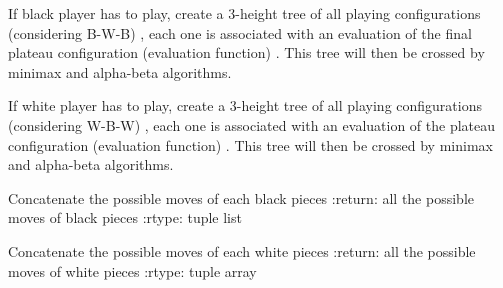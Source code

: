 \documentclass[letterpaper,10pt,french]{sphinxmanual}
\begin{document}
\begin{fulllineitems}
\label{\detokenize{autodoc:echecs.create_tree_B}}
If black player has to play, create a 3-height tree of all playing configurations (considering B-W-B)
, each one is associated with an evaluation of the final plateau configuration (evaluation function)
. This tree will then be crossed by minimax and alpha-beta algorithms.

\end{fulllineitems}


\begin{fulllineitems}
\label{\detokenize{autodoc:echecs.create_tree_W}}
If white player has to play, create a 3-height tree of all playing configurations (considering W-B-W)
, each one is associated with an evaluation of the plateau configuration (evaluation function)
. This tree will then be crossed by minimax and alpha-beta algorithms.

\end{fulllineitems}


\begin{fulllineitems}
\label{\detokenize{autodoc:echecs.create_tree_W_viz}}
\end{fulllineitems}


\begin{fulllineitems}
\label{\detokenize{autodoc:echecs.ensemble_move_possible_B}}
Concatenate the possible moves of each black pieces
:return: all the possible moves of black pieces
:rtype: tuple list

\end{fulllineitems}


\begin{fulllineitems}
\label{\detokenize{autodoc:echecs.ensemble_move_possible_W}}
Concatenate the possible moves of each white pieces
:return: all the possible moves of white pieces
:rtype: tuple array

\end{fulllineitems}
\end{document}
